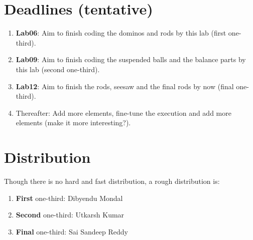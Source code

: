 \documentclass{article}
\begin{document}
\section*{Deadlines (tentative)}
\begin{enumerate}
\item[] \textbf{Lab06}: Aim to finish coding the dominos and rods by this lab (first one-third).
\item[] \textbf{Lab09}: Aim to finish coding the suspended balls and the balance parts by this lab (second one-third).
\item[] \textbf{Lab12}: Aim to finish the rods, seesaw and the final rods by now (final one-third).
\item[] Thereafter: Add more elements, fine-tune the execution and add more elements (make it more interesting?).
\end{enumerate}

\section*{Distribution}
Though there is no hard and fast distribution, a rough distribution is:
\begin{enumerate}
\item[] \textbf{First} one-third: Dibyendu Mondal
\item[] \textbf{Second} one-third: Utkarsh Kumar
\item[] \textbf{Final} one-third: Sai Sandeep Reddy
\end{enumerate}
\end{document}
